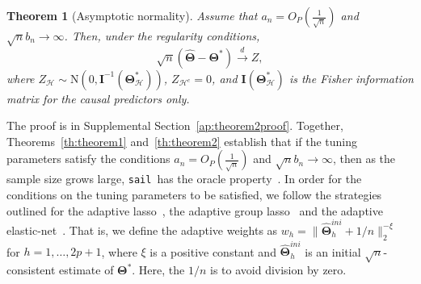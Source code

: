 \documentclass[12pt,letter]{article}\usepackage[]{graphicx}\usepackage[]{color}
\newtheorem{theorem}{Theorem}
\newcommand{\sail}{\texttt{sail}}
\newcommand{\bTheta}{\boldsymbol{\Theta}}
\newcommand{\btheta}{\boldsymbol{\theta}}
\begin{document}
\begin{theorem}[Asymptotic normality] \label{th:theorem2}
	Assume that $a_n = O_P(\frac{1}{\sqrt{n}})$ and $\sqrt{n}b_n \to \infty$. Then, under the regularity conditions, 
	\begin{equation}
	\sqrt{n}\left(\widehat{\bTheta}-\bTheta^{*}\right) \stackrel{d}{\rightarrow} Z,
	\end{equation}
	where $Z_{\mathcal{H}} \sim \mathrm{N}\left(0, \mathbf{I}^{-1}\left(\boldsymbol{\Theta}_{\mathcal{H}}^{*}\right) \right)$, $Z_{\mathcal{H}^{c}}=0$, and $\mathbf{I}\left(\boldsymbol{\Theta}_{\mathcal{H}}^{*}\right)$ is the Fisher information matrix for the causal predictors only. 
\end{theorem}
The proof is in Supplemental Section~\ref{ap:theorem2proof}. Together, Theorems~\eqref{th:theorem1} and~\eqref{th:theorem2} establish that if the tuning parameters satisfy the conditions $a_n = O_P(\frac{1}{\sqrt{n}})$ and $\sqrt{n}b_n \to \infty$, then as the sample size grows large, \sail ~has the oracle property~\citep{fan2001variable}. In order for the conditions on the tuning parameters to be satisfied, we follow the strategies outlined for the adaptive lasso~\citep{zou2006adaptive}, the adaptive group lasso~\citep{nardi2008asymptotic} and the adaptive elastic-net~\citep{zou2009adaptive}. That is, we define the adaptive weights as $w_h = \| \widehat{\bTheta}_h^{ini} + 1/n \|_2^{-\xi}$ for $h=1, \ldots, 2p+1$, where $\xi$ is a positive constant and $\widehat{\bTheta}_h^{ini}$ is an initial $\sqrt{n}$-consistent estimate of $\bTheta^*$. Here, the $1/n$ is to avoid division by zero. 
\end{document}
